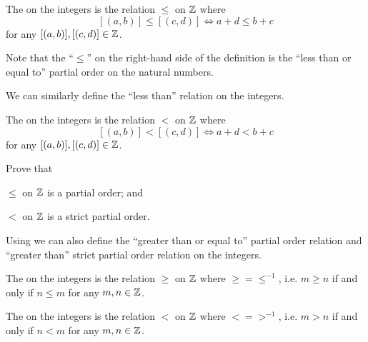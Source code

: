 \begin{definition}
    The  on the integers is the relation $\leq$ on $\mathbb{Z}$ where
    \[
        [(a,b)] \leq [(c,d)] \iff a + d \leq b + c
    \]
    for any $[(a,b)], [(c,d)] \in \mathbb{Z}$.
\end{definition}
Note that the ``$\leq$'' on the right-hand side of the definition is the ``less than or equal to'' partial order on the natural numbers.

We can similarly define the ``less than'' relation on the integers.

\begin{definition}
    The  on the integers is the relation $<$ on $\mathbb{Z}$ where
    \[
        [(a,b)] < [(c,d)] \iff a + d < b + c
    \]
    for any $[(a,b)], [(c,d)] \in \mathbb{Z}$.
\end{definition}

\begin{exercise}
    Prove that
    \begin{partquestions}{\alph*}
        \item $\leq$ on $\mathbb{Z}$ is a partial order; and
        \item $<$ on $\mathbb{Z}$ is a strict partial order.
    \end{partquestions}
\end{exercise}

Using  we can also define the ``greater than or equal to'' partial order relation and ``greater than'' strict partial order relation on the integers.

\begin{definition}
    The  on the integers is the relation $\geq$ on $\mathbb{Z}$ where $\geq = \leq^{-1}$, i.e. $m \geq n$ if and only if $n \leq m$ for any $m, n \in \mathbb{Z}$.
\end{definition}

\begin{definition}
    The  on the integers is the relation $<$ on $\mathbb{Z}$ where $< = >^{-1}$, i.e. $m > n$ if and only if $n < m$ for any $m, n \in \mathbb{Z}$.
\end{definition}

